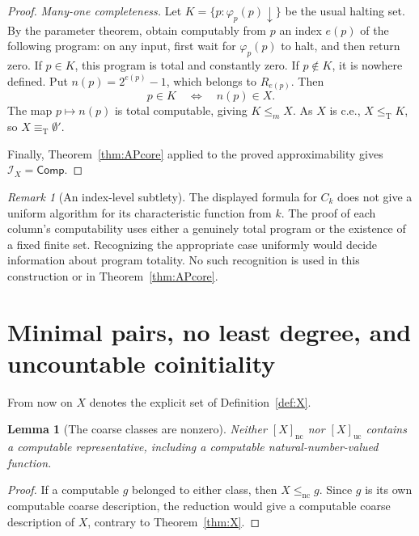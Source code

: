 \documentclass[11pt,a4paper]{article}
\newcommand{\leT}{\leq_{\mathrm T}}
\newcommand{\eqT}{\equiv_{\mathrm T}}
\newcommand{\nc}{\mathrm{nc}}
\newcommand{\uc}{\mathrm{uc}}
\newcommand{\core}{\mathcal I}
\newcommand{\Comp}{\mathsf{Comp}}
\newtheorem{lemma}[theorem]{Lemma}
\theoremstyle{definition}\newtheorem{definition}[theorem]{Definition}
\theoremstyle{remark}\newtheorem{remark}[theorem]{Remark}
\begin{document}
\begin{proof}
\emph{Many-one completeness.} Let
$K=\{p:\varphi_p(p)\downarrow\}$ be the usual halting set. By the parameter
 theorem, obtain computably from $p$ an index $e(p)$ of the following program:
on any input, first wait for $\varphi_p(p)$ to halt, and then return zero.
If $p\in K$, this program is total and constantly zero. If $p\notin K$, it is
nowhere defined. Put $n(p)=2^{e(p)}-1$, which belongs to $R_{e(p)}$. Then
\[
 p\in K\quad\Longleftrightarrow\quad n(p)\in X.
\]
The map $p\mapsto n(p)$ is total computable, giving $K\le_m X$. As $X$ is
c.e., $X\leT K$, so $X\eqT\emptyset'$.

Finally, Theorem~\ref{thm:APcore} applied to the proved approximability gives
$\core_X=\Comp$.
\end{proof}

\begin{remark}[An index-level subtlety]
The displayed formula for $C_k$ does not give a uniform algorithm for its
characteristic function from $k$. The proof of each column's computability
uses either a genuinely total program or the existence of a fixed finite set.
Recognizing the appropriate case uniformly would decide information about
program totality. No such recognition is used in this construction or in
Theorem~\ref{thm:APcore}.
\end{remark}

\section{Minimal pairs, no least degree, and uncountable coinitiality}
\label{sec:consequences}
From now on $X$ denotes the explicit set of Definition~\ref{def:X}.

\begin{lemma}[The coarse classes are nonzero]\label{lem:nonzero}
Neither $[X]_{\nc}$ nor $[X]_{\uc}$ contains a computable representative,
including a computable natural-number-valued function.
\end{lemma}
\begin{proof}
If a computable $g$ belonged to either class, then $X\le_{\nc}g$. Since $g$
is its own computable coarse description, the reduction would give a
computable coarse description of $X$, contrary to Theorem~\ref{thm:X}.
\end{proof}
\end{document}
